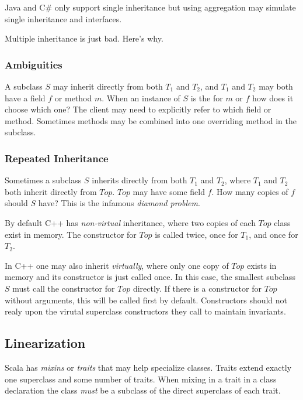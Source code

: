 \documentclass{article}
\begin{document}
\begin{remark}\label{multipleinheritancejava}
Java and C\# only support single inheritance but using aggregation may simulate single inheritance and interfaces.
\end{remark}

Multiple inheritance is just bad. Here's why.

\subsubsection{Ambiguities}

A subclass $S$ may inherit directly from both $T_1$ and $T_2$, and $T_1$ and $T_2$ may both have a field $f$ or method $m$. When an instance of $S$ is the \receiver{} for $m$ or $f$ how does it choose which one? The client may need to explicitly refer to which field or method. Sometimes methods may be combined into one overriding method in the subclass.

\subsubsection{Repeated Inheritance}

Sometimes a subclass $S$ inherits directly from both $T_1$ and $T_2$, where $T_1$ and $T_2$ both inherit directly from $Top$. $Top$ may have some field $f$. How many copies of $f$ should $S$ have? This is the infamous \textit{diamond problem}.

By default C++ has \textit{non-virtual} inheritance, where two copies of each $Top$ class exist in memory. The constructor for $Top$ is called twice, once for $T_1$, and once for $T_2$.

In C++ one may also inherit \textit{virtually}, where only one copy of $Top$ exists in memory and its constructor is just called once.
In this case, the smallest subclass $S$ must call the constructor for $Top$ directly.
If there is a constructor for $Top$ without arguments, this will be called first by default. Constructors should not realy upon the virutal superclass constructors they call to maintain invariants.

\subsection{Linearization}

Scala has \textit{mixins} or \textit{traits} that may help specialize classes. Traits extend exactly one superclass and some number of traits. When mixing in a trait in a class declaration the class \textit{must} be a subclass of the direct superclass of each trait.
\end{document}
